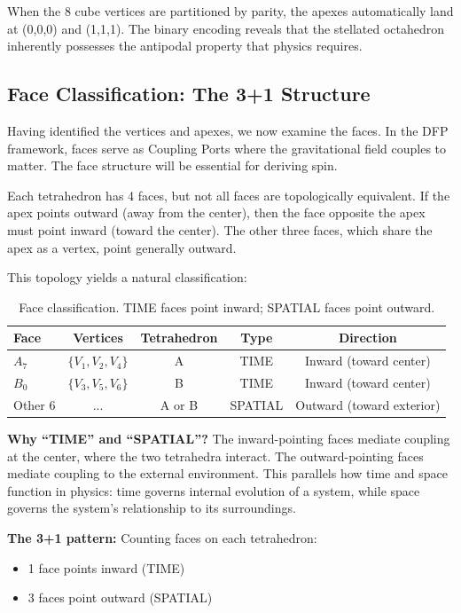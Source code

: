 \documentclass[aps,prd,preprint,superscriptaddress,showpacs,preprintnumbers,amsmath,amssymb,nofootinbib]{revtex4-2}
\begin{document}
When the 8 cube vertices are partitioned by parity, the apexes automatically land at (0,0,0) and (1,1,1). The binary encoding reveals that the stellated octahedron inherently possesses the antipodal property that physics requires.

\subsection{Face Classification: The 3+1 Structure}
\label{subsec:faces}

Having identified the vertices and apexes, we now examine the faces. In the DFP framework, faces serve as Coupling Ports where the gravitational field couples to matter. The face structure will be essential for deriving spin.

Each tetrahedron has 4 faces, but not all faces are topologically equivalent. If the apex points outward (away from the center), then the face opposite the apex must point inward (toward the center). The other three faces, which share the apex as a vertex, point generally outward.

This topology yields a natural classification:

\begin{table}[H]
\centering
\begin{tabular*}{\textwidth}{@{\extracolsep{\fill}} lcccc @{}}
\toprule
\textbf{Face} & \textbf{Vertices} & \textbf{Tetrahedron} & \textbf{Type} & \textbf{Direction} \\
\midrule
$A_7$ & $\{V_1, V_2, V_4\}$ & A & TIME & Inward (toward center) \\
$B_0$ & $\{V_3, V_5, V_6\}$ & B & TIME & Inward (toward center) \\
Other 6 & ... & A or B & SPATIAL & Outward (toward exterior) \\
\bottomrule
\end{tabular*}
\caption{Face classification. TIME faces point inward; SPATIAL faces point outward.}
\label{tab:faces}
\end{table}

\textbf{Why ``TIME'' and ``SPATIAL''?} The inward-pointing faces mediate coupling at the center, where the two tetrahedra interact. The outward-pointing faces mediate coupling to the external environment. This parallels how time and space function in physics: time governs internal evolution of a system, while space governs the system's relationship to its surroundings.

\textbf{The 3+1 pattern:} Counting faces on each tetrahedron:
\begin{itemize}
\item 1 face points inward (TIME)
\item 3 faces point outward (SPATIAL)
\end{itemize}
\end{document}
